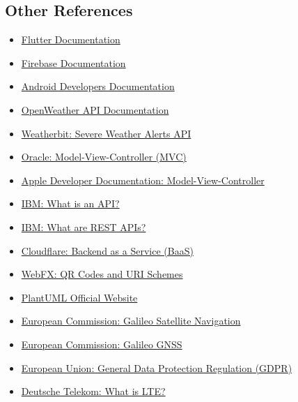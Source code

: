\subsection{Other References}
\begin{itemize}
    \item \href{https://docs.flutter.dev/}{Flutter Documentation}
    \item \href{https://firebase.google.com/docs/}{Firebase Documentation}
    \item \href{https://developer.android.com/docs}{Android Developers Documentation}

    \item \href{https://openweathermap.org/api/one-call-3?collection=one_call_api_3.0}{OpenWeather API Documentation}
    \item \href{https://www.weatherbit.io/api/alerts}{Weatherbit: Severe Weather Alerts API}

    \item \href{https://www.oracle.com/technical-resources/articles/javase/application-design-with-mvc.html}{Oracle: Model-View-Controller (MVC)}
    \item \href{https://developer.apple.com/library/archive/documentation/General/Conceptual/CocoaEncyclopedia/Model-View-Controller/Model-View-Controller.html}{Apple Developer Documentation: Model-View-Controller}

    \item \href{https://www.ibm.com/think/topics/api}{IBM: What is an API?}
    \item \href{https://www.ibm.com/think/topics/rest-apis}{IBM: What are REST APIs?}

    \item \href{https://www.cloudflare.com/learning/serverless/glossary/backend-as-a-service-baas/}{Cloudflare: Backend as a Service (BaaS)}
    \item \href{https://www.webfx.com/blog/web-design/qr-codes-uri-schemes/}{WebFX: QR Codes and URI Schemes}
    \item \href{https://www.plantuml.com}{PlantUML Official Website}
    \item \href{https://defence-industry-space.ec.europa.eu/eu-space/galileo-satellite-navigation_en}{European Commission: Galileo Satellite Navigation}
    \item \href{https://defence-industry-space.ec.europa.eu/document/download/04ae75b0-e6b6-4a12-9e14-ecd9cd6c1a7a_en?filename=Galileo%20the%20EU%20GNSS%20Factsheet.pdf}{European Commission: Galileo GNSS}
    \item \href{https://gdpr.eu/}{European Union: General Data Protection Regulation (GDPR)}
    \item \href{https://www.telekom.com/en/company/details/the-nine-most-important-facts-about-lte-606446}{Deutsche Telekom: What is LTE?}
\end{itemize}









